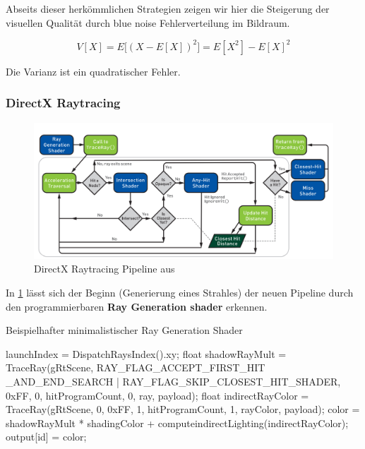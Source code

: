 Abseits dieser herkömmlichen Strategien zeigen wir hier die Steigerung der 
visuellen Qualität durch blue noise Fehlerverteilung im Bildraum.

\begin{equation}\label{eq:Monte-Carlo-Varianz}
    V[X] = E\biggl[(X-E[X])^{2}\biggl] = E[X^{2}]
    - E[X]^{2}
\end{equation}

Die Varianz  ist ein quadratischer Fehler.

\subsubsection{DirectX Raytracing}

\begin{figure}[H]
    \centering
    \includegraphics[width=\linewidth]{content/PathTracer/Bilder/DirectXRaytracingPipeline.png}
    \caption{DirectX Raytracing Pipeline aus \cite{Haines2019}}
    \label{pic:DirectXRaytracingPipeline}
\end{figure}

In \ref{pic:DirectXRaytracingPipeline} lässt sich der Beginn (Generierung eines Strahles) der neuen Pipeline
durch den programmierbaren \textbf{Ray Generation shader} erkennen.

\begin{algorithm}[H]
    \caption{Beispielhafter minimalistischer Ray Generation Shader}
    \begin{algorithmic}[1]
        \State launchIndex = DispatchRaysIndex().xy;
            \State float shadowRayMult = TraceRay(gRtScene,
            RAY\_FLAG\_ACCEPT\_FIRST\_HIT \_AND\_END\_SEARCH |
            RAY\_FLAG\_SKIP\_CLOSEST\_HIT\_SHADER,
            0xFF, 0, hitProgramCount, 0, ray, payload);
            \State float indirectRayColor = TraceRay(gRtScene, 0, 0xFF, 1, hitProgramCount, 1, rayColor, payload);
            \State color = shadowRayMult * shadingColor + computeindirectLighting(indirectRayColor);
        \EndFor
        \State output[id] = color;
    \end{algorithmic}
    \label{alg:Ray Gen}
\end{algorithm}

